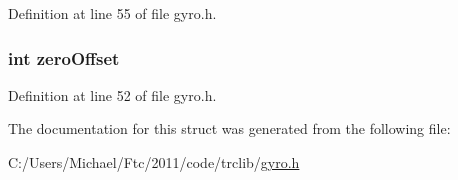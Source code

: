 Definition at line 55 of file gyro.h.

\hypertarget{struct_g_y_r_o_a40304f830741a043ccf22db881cfe132}{
\subsubsection[{zeroOffset}]{\setlength{\rightskip}{0pt plus 5cm}int {\bf zeroOffset}}}
\label{struct_g_y_r_o_a40304f830741a043ccf22db881cfe132}


Definition at line 52 of file gyro.h.



The documentation for this struct was generated from the following file:\begin{DoxyCompactItemize}
\item 
C:/Users/Michael/Ftc/2011/code/trclib/\hyperlink{gyro_8h}{gyro.h}\end{DoxyCompactItemize}

